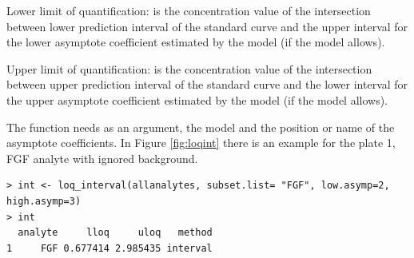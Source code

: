 \documentclass[11pt]{article}\usepackage[]{graphicx}\usepackage[]{color}
\makeatletter
\newenvironment{kframe}{%
 \def\at@end@of@kframe{}%
 \ifinner\ifhmode%
  \def\at@end@of@kframe{\end{minipage}}%
  \begin{minipage}{\columnwidth}%
 \fi\fi%
 \def\FrameCommand##1{\hskip\@totalleftmargin \hskip-\fboxsep
 \colorbox{shadecolor}{##1}\hskip-\fboxsep
     \hskip-\linewidth \hskip-\@totalleftmargin \hskip\columnwidth}%
 \MakeFramed {\advance\hsize-\width
   \@totalleftmargin\z@ \linewidth\hsize
   \@setminipage}}%
 {\par\unskip\endMakeFramed%
 \at@end@of@kframe}
\newenvironment{knitrout}{}{} %
\newenvironment{itemize*}%
    {\begin{itemize}%
        \setlength{\itemsep}{-0.35cm}%
        \setlength{\parskip}{10pt}}%
{\end{itemize}}
\makeatother
\begin{document}
\begin{itemize*}
\item Lower limit of quantification: is the concentration 
value of the intersection between lower prediction interval of the 
standard curve and the upper interval for the lower asymptote coefficient 
estimated by the model (if the model allows).
\item Upper limit of quantification: is the concentration 
value of the intersection between upper prediction interval of the standard 
curve and the lower interval for the upper asymptote coefficient 
estimated by the model (if the model allows).
\end{itemize*}

\noindent The function needs as an argument, the model and the position 
or name of the asymptote coefficients. In Figure \ref{fig:loqint} there is an 
example for the plate 1, FGF analyte with ignored background.

\begin{knitrout}
\color{fgcolor}\begin{kframe}
\begin{verbatim}
> int <- loq_interval(allanalytes, subset.list= "FGF", low.asymp=2, high.asymp=3)
> int
  analyte     lloq     uloq   method
1     FGF 0.677414 2.985435 interval
\end{verbatim}
\end{kframe}
\end{knitrout}
\end{document}
